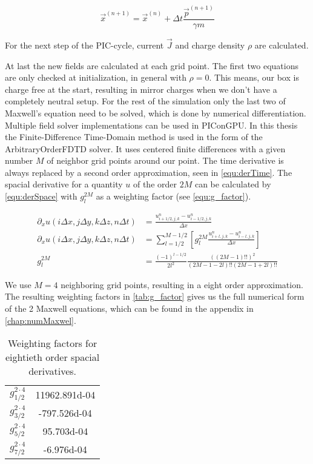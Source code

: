 \documentclass[bachelor_thesis]{subfiles}
\begin{document}
\begin{equation}
	\vec{x}^{(n+1)} = \vec{x}^{(n)} + \Delta t \frac{\vec{p}^{(n+1)}}{\gamma m}
	\label{equ:euler}
\end{equation}

For the next step of the PIC-cycle, current $\vec{J}$ and charge density $\rho$ are calculated. 

At last the new fields are calculated at each grid point. The first two equations are only checked at initialization, in general with $\rho=0$. This means, our box is charge free at the start, resulting in mirror charges when we don't have a completely neutral setup.
For the rest of the simulation only the last two of Maxwell's equation need to be solved, which is done by numerical differentiation. 
Multiple field solver implementations can be used in PIConGPU. In this thesis the Finite-Difference Time-Domain method is used in the form of the ArbitraryOrderFDTD solver. It uses centered finite differences with a given number $M$ of neighbor grid points around our point.
The time derivative is always replaced by a second order approximation, seen in \autoref{equ:derTime}. The spacial derivative for a quantity $u$ of the order $2M$ can be calculated by \autoref{equ:derSpace} with $g_l^{2M}$ as a weighting factor (see \autoref{equ:g_factor}).

\begin{align}
\partial_x u(i\Delta x,j\Delta y,k\Delta z,n\Delta t) &= \frac{u_{i+1/2,j,k}^n - u_{i-1/2,j,k}^n}{\Delta x} 									\label{equ:derTime}	\\
\partial_x u(i\Delta x,j\Delta y,k\Delta z,n\Delta t) &=  \sum\limits_{l=1/2}^{M-1/2} \left[ g^{2M}_l \frac{u_{i + l, j, k}^n - u_{i - l, j, k}^n}{\Delta x} \right] 	\label{equ:derSpace}	\\
g^{2M}_l &= \frac{(-1)^{l-1/2}}{2l^2} \frac{((2M-1)!!)^2}{(2M -1 - 2l)!! (2M -1 + 2l)!!}											\label{equ:g_factor}
\end{align}

We use $M=4$ neighboring grid points, resulting in a eight order approximation. The resulting weighting factors in \autoref{tab:g_factor} gives us the full numerical form of the 2 Maxwell equations, which can be found in the appendix in \autoref{chap:numMaxwel}.
\begin{table}
\begin{center}
\begin{tabular}{ |c|c| }
	\hline
	$g_{1/2}^{2\cdot 4}$ & \num{11962.891d-04} \\ 
	$g_{3/2}^{2\cdot 4}$ & \num{-797.526d-04} \\  
	$g_{5/2}^{2\cdot 4}$ & \num{95.703d-04} \\	
	$g_{7/2}^{2\cdot 4}$ & \num{-6.976d-04} \\
	 \hline
\end{tabular}
\caption{Weighting factors for eightieth order spacial derivatives.}
\end{center}\label{tab:g_factor}
\end{table}
\end{document}
